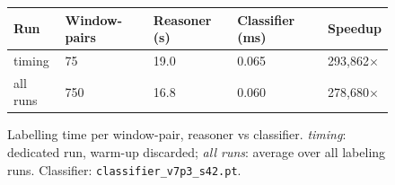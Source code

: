 \begin{figure}[t]
\centering
\begin{tabular}{lllll}
\toprule
Run & Window-pairs & Reasoner (s) & Classifier (ms) & Speedup \\
\midrule
timing & 75 & 19.0 & 0.065 & 293,862$\times$ \\
all runs & 750 & 16.8 & 0.060 & 278,680$\times$ \\
\bottomrule
\end{tabular}
\caption{\small{Labelling time per window-pair, reasoner vs classifier. \emph{timing}: dedicated run, warm-up discarded; \emph{all runs}: average over all labeling runs. Classifier: \texttt{classifier\_v7p3\_s42.pt}.}}
\label{fig:speedup_pub}
\end{figure}
